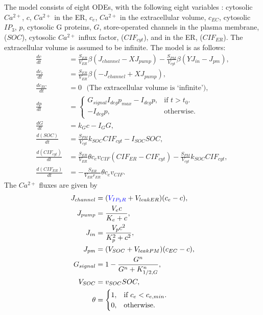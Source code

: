The model consists of eight ODEs, with the following eight variables : cytosolic $Ca^{2+}$, $c$, $Ca^{2+}$ in the ER, $c_e$, $Ca^{2+}$ in the extracellular volume, $c_{EC}$, cytosolic $IP_3$, $p$, cytosolic G proteins, $G$, store-operated channels in the plasma membrane, ($SOC$), cytosolic $Ca^{2+}$ influx factor, ($CIF_{cyt}$), and in the ER, ($CIF_{ER}$). The extracellular volume is assumed to be infinite. The model is as follows: 
\begin{align}
    \frac{dc}{dt}&=\frac{S_{ER}}{V_{ER}}\beta (J_{channel}-XJ_{pump})-\frac{S_{PM}}{V_{cyt}}\beta (YJ_{in}-J_{pm})\label{swedishc},\\
    \frac{dc_e}{dt}&=\frac{S_{ER}}{V_{ER}}\beta (-J_{channel}+XJ_{pump})\label{swedisher},\\
    \frac{dc_{EC}}{dt}&=0\text{    {(The extracellular volume is ‘infinite’)}},\label{eqeCE}\\
    \frac{dp}{dt}&=\begin{cases}
    G_{signal}I_{deg}p_{max}-I_{deg}p,  &\text{if $t>t_0$}.\\
    -I_{deg}p,  &\text{otherwise}.\label{swedishp}
  \end{cases}\\
    \frac{dG}{dt}&=k_Gc-I_GG,\label{Gode}\\
    \frac{d(SOC)}{dt}&=\frac{S_{PM}}{V_{cyt}}k_{SOC}CIF_{cyt}-I_{SOC}SOC,\label{SOC}\\
    \frac{d(CIF_{cyt})}{dt}&=\frac{S_{ER}}{V_{ER}}\theta c_ev_{CIF}(CIF_{ER}-CIF_{cyt})-\frac{S_{PM}}{V_{cyt}}k_{SOC}CIF_{cyt},\label{cytoCIF}\\
    \frac{d(CIF_{ER})}{dt}&=-\frac{S_{ER}}{V_{ER}r_{ER}}\theta c_ev_{CIF}.\label{ERCIF}
\end{align}
The $Ca^{2+}$ fluxes are given by
\begin{align}
    J_{channel}&=(\textcolor{blue}{V_{IP_3R}}+V_{leak ER})(c_e-c),\label{swedishvip3r}\\
    J_{pump}&=\frac{V_ec}{K_e+c},\nonumber\\
    J_{in}&=\frac{V_pc^2}{K_p^2+c^2},\nonumber\\
    J_{pm}&=(V_{SOC}+V_{leak PM})(c_{EC}-c),\nonumber\\
   G_{signal}&=1-\frac{G^n}{G^n+K_{1/2,G}^n},\nonumber\\
   V_{SOC}&=v_{SOC}SOC,\nonumber\\
   \theta&=\begin{cases}
    1,  &\text{if $c_e<c_{e,min}$}.\nonumber\\
    0,  &\text{otherwise}.\nonumber
  \end{cases}
\end{align}
